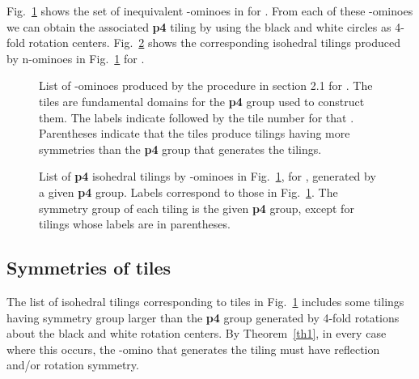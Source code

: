 \documentclass{ws-ijcga}
\begin{document}
Fig.~\ref{p4fighi} shows the set of inequivalent -ominoes in 
for . 
From each of these -ominoes
we can obtain the associated {\bf p4} tiling by using the black and white circles as 4-fold rotation
centers. 
Fig.~\ref{p4tiling} shows the corresponding isohedral tilings produced by n-ominoes in Fig.~\ref{p4fighi} for .
\begin{figure}[h]
\centerline{}
\caption{
List of -ominoes produced by the procedure in section 2.1 for . 
The tiles are fundamental domains for
the {\bf p4} group used to construct them. 
The labels indicate  followed by the tile number for that . Parentheses
indicate that the tiles produce tilings having more symmetries than the {\bf p4} group that generates the tilings.
\label{p4fighi}
}
\end{figure}
\begin{figure}[h]
\centerline{}
\caption{
List of {\bf p4} isohedral tilings by -ominoes in Fig.~\ref{p4fighi}, for , 
generated by a given {\bf p4} group. Labels
correspond to those in Fig.~\ref{p4fighi}. 
The symmetry group of each tiling is the given {\bf p4} group, 
except for tilings whose labels are in parentheses.
\label{p4tiling}
}
\end{figure}


\subsection{Symmetries of tiles}
The list of isohedral tilings corresponding to tiles in Fig.~\ref{p4fighi} includes some tilings having
symmetry group larger than the {\bf p4} group  generated by 4-fold rotations about the black
and white rotation centers. By Theorem~\ref{th1}, in every case where this occurs, the -omino
that generates the tiling must have reflection and/or rotation symmetry.
\end{document}
